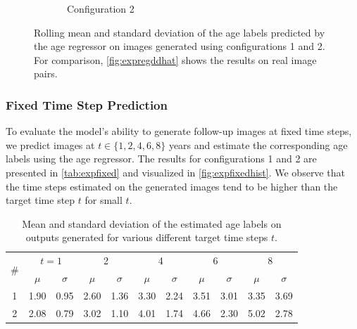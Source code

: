 \begin{figure}[h]
\begin{subfigure}{0.48\textwidth}
		\caption{\ Configuration 2}
	\end{subfigure}
	 
	\caption{Rolling mean and standard deviation of the age labels predicted by the age regressor on images generated using configurations 1 and 2. For comparison, \autoref{fig:expregddhat} shows the results on real image pairs.}
	\label{fig:expfollowuprolling}
\end{figure}

\subsubsection*{Fixed Time Step Prediction}
To evaluate the model's ability to generate follow-up images at fixed time steps, we predict images at $t \in \{1, 2, 4, 6, 8\}$ years and estimate the corresponding age labels using the age regressor. The results for configurations 1 and 2 are presented in \autoref{tab:expfixed} and visualized in \autoref{fig:expfixedhist}. We observe that the time steps estimated on the generated images tend to be higher than the target time step $t$ for small $t$.

\begin{table}[h]
	\begin{center}
		\begin{tabular}{c c c c c c c c c c c}
			\toprule
			\multirow{2}{*}{\#} &
			\multicolumn{2}{c}{$t = 1$} &
			\multicolumn{2}{c}{2} &
			\multicolumn{2}{c}{4} &
			\multicolumn{2}{c}{6} &
			\multicolumn{2}{c}{8} \\
			\cmidrule(lr){2-3}
			\cmidrule(lr){4-5}
			\cmidrule(lr){6-7}
			\cmidrule(lr){8-9}
			\cmidrule(lr){10-11}
			 & $\mu$ & $\sigma$ & $\mu$ & $\sigma$ & $\mu$ & $\sigma$ & $\mu$ & $\sigma$ & $\mu$ & $\sigma$ \\
			\cmidrule(lr){1-11}
			1 & 1.90 & 0.95 & 2.60 & 1.36 & 3.30 & 2.24 & 3.51 & 3.01 & 3.35 & 3.69 \\
			2 & 2.08 & 0.79 & 3.02 & 1.10 & 4.01 & 1.74 & 4.66 & 2.30 & 5.02 & 2.78 \\
			\bottomrule
		\end{tabular}
		\caption{Mean and standard deviation of the estimated age labels on outputs generated for various different target time steps $t$.}
		\label{tab:expfixed}
	\end{center}
\end{table}

